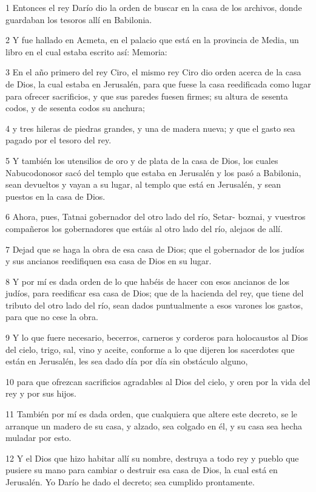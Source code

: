 \par 1 Entonces el rey Darío dio la orden de buscar en la casa de los archivos, donde guardaban los tesoros allí en Babilonia.
\par 2 Y fue hallado en Acmeta, en el palacio que está en la provincia de Media, un libro en el cual estaba escrito así: Memoria:
\par 3 En el año primero del rey Ciro, el mismo rey Ciro dio orden acerca de la casa de Dios, la cual estaba en Jerusalén, para que fuese la casa reedificada como lugar para ofrecer sacrificios, y que sus paredes fuesen firmes; su altura de sesenta codos,  y de sesenta codos su anchura;
\par 4 y tres hileras de piedras grandes, y una de madera nueva; y que el gasto sea pagado por el tesoro del rey.
\par 5 Y también los utensilios de oro y de plata de la casa de Dios, los cuales Nabucodonosor sacó del templo que estaba en Jerusalén y los pasó a Babilonia, sean devueltos y vayan a su lugar, al templo que está en Jerusalén, y sean puestos en la casa de Dios.
\par 6 Ahora, pues, Tatnai gobernador del otro lado del río, Setar- boznai, y vuestros compañeros los gobernadores que estáis al otro lado del río, alejaos de allí.
\par 7 Dejad que se haga la obra de esa casa de Dios; que el gobernador de los judíos y sus ancianos reedifiquen esa casa de Dios en su lugar.
\par 8 Y por mí es dada orden de lo que habéis de hacer con esos ancianos de los judíos, para reedificar esa casa de Dios; que de la hacienda del rey, que tiene del tributo del otro lado del río, sean dados puntualmente a esos varones los gastos, para que no cese la obra.
\par 9 Y lo que fuere necesario, becerros, carneros y corderos para holocaustos al Dios del cielo, trigo, sal, vino y aceite, conforme a lo que dijeren los sacerdotes que están en Jerusalén, les sea dado día por día sin obstáculo alguno,
\par 10 para que ofrezcan sacrificios agradables al Dios del cielo, y oren por la vida del rey y por sus hijos.
\par 11 También por mí es dada orden, que cualquiera que altere este decreto, se le arranque un madero de su casa, y alzado, sea colgado en él, y su casa sea hecha muladar por esto.
\par 12 Y el Dios que hizo habitar allí su nombre, destruya a todo rey y pueblo que pusiere su mano para cambiar o destruir esa casa de Dios, la cual está en Jerusalén. Yo Darío he dado el decreto; sea cumplido prontamente.
